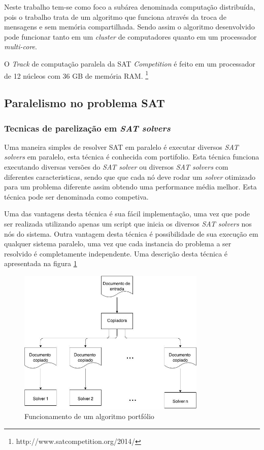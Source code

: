 \documentclass{ufsc-thesis}
\begin{document}
Neste trabalho tem-se como foco a subárea denominada computação distribuída, pois 
o trabalho trata de um algoritmo que funciona através da troca de mensagens e sem memória 
compartilhada\cite{Coulouris2011}. Sendo assim o algoritmo desenvolvido pode 
funcionar tanto em um \textit{cluster} de computadores quanto em um processador \textit{multi-core}.

O \textit{Track} de computação paralela da SAT \textit{Competition} é 
feito em um processador de 12 núcleos com 36 GB de memória RAM.
\footnote{http://www.satcompetition.org/2014/}

\subsection{Paralelismo no problema SAT}

\subsubsection{Tecnicas de parelização em \textit{SAT solvers}}

Uma maneira simples de resolver SAT em paralelo é executar diversos \textit{SAT solvers} 
em paralelo, esta técnica é conhecida com portifolio. Esta técnica funciona executando 
diversas versões do \textit{SAT solver} ou diversos \textit{SAT solvers} com diferentes 
caracteristicas, sendo que que cada nó deve rodar um \textit{solver} otimizado para um 
problema diferente assim obtendo uma performance média melhor. Esta técnica pode ser 
denominada como competiva.

Uma das vantagens desta técnica é sua fácil implementação, uma vez que pode ser realizada 
utilizando apenas um script que inicia os diversos \textit{SAT solvers} nos nós do sistema. 
Outra vantagem desta técnica é possibilidade de sua execução em qualquer sistema paralelo, uma 
vez que cada instancia do problema a ser resolvido é completamente independente. Uma descrição 
desta técnica é apresentada na figura \ref{fig:port}

\begin{figure}[H]
    \centering
    \includegraphics[width=0.8\textwidth]{figuras/portfolio.jpg}
    \caption{Funcionamento de um algoritmo portfólio\cite{nelson2013new}}
    \label{fig:port}
\end{figure}
\end{document}
